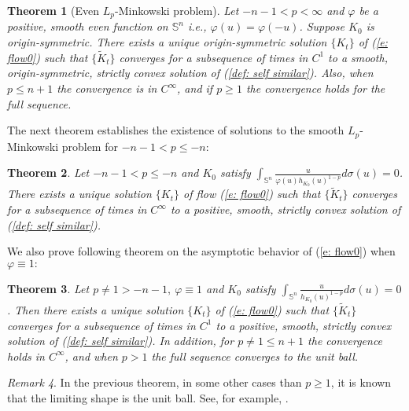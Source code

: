 \documentclass{amsart}
\newtheorem{theorem}{Theorem}
\theoremstyle{definition}
\theoremstyle{remark}
\newtheorem{remark}[theorem]{Remark}
\numberwithin{equation}{section}
\begin{document}
\begin{theorem}[Even $L_p$-Minkowski problem]
Let $-n-1<p<\infty$ and $\varphi$ be a positive, smooth even function on $\mathbb{S}^{n}$ i.e., $\varphi(u)=\varphi(-u)$. Suppose $K_0$ is origin-symmetric. There exists a unique origin-symmetric solution $\{K_t\}$ of (\ref{e: flow0}) such that $\{\tilde{K}_t\}$ converges for a subsequence of times in $C^{1}$ to a smooth, origin-symmetric, strictly convex solution of (\ref{def: self similar}). Also, when $p\leq n+1$ the convergence is in $C^{\infty}$, and if $p\ge 1$ the convergence holds for the full sequence.
\end{theorem}
The next theorem establishes the existence of solutions to the smooth $L_p$-Minkowski problem for $-n-1< p\leq -n$:
\begin{theorem}
Let $-n-1< p\leq -n$ and $K_0$ satisfy $\int_{\mathbb{S}^{n}}\frac{u}{\varphi(u)h_{K_0}(u)^{1-p}}d\sigma(u)=0$. There exists a unique solution $\{K_t\}$ of flow (\ref{e: flow0}) such that $\{\tilde{K}_t\}$ converges for a subsequence of times in $C^{\infty}$ to a positive, smooth, strictly convex solution of (\ref{def: self similar}).
\end{theorem}
We also prove following theorem on the asymptotic behavior of (\ref{e: flow0}) when $\varphi\equiv 1:$
\begin{theorem}
Let $p\neq 1>-n-1,~\varphi\equiv 1$ and $K_0$ satisfy $\int_{\mathbb{S}^{n}}\frac{u}{h_{K_0}(u)^{1-p}}d\sigma(u)=0$. Then there exists a unique solution $\{K_t\}$ of (\ref{e: flow0}) such that $\{\tilde{K}_t\}$ converges for a subsequence of times in $C^{1}$ to a positive, smooth, strictly convex solution of (\ref{def: self similar}). In addition, for $p\neq 1\leq n+1$ the convergence holds in $C^{\infty}$, and when $p> 1$ the full sequence converges to the unit ball.
\end{theorem}
\begin{remark}
In the previous theorem, in some other cases than $p\ge 1$, it is known that the limiting shape is the unit ball. See, for example, \cite{Andrews 1999, andrewschen}.
\end{remark}
\end{document}
